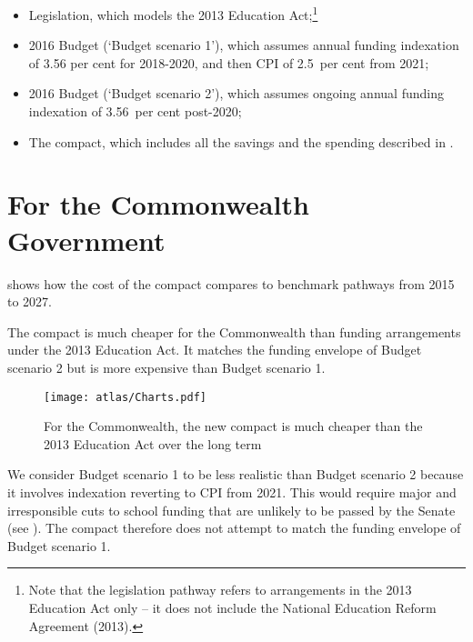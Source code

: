 \documentclass{grattan}
\begin{document}
\begin{itemize}
\item
  Legislation, which models the 2013 Education Act;\footnote{Note that the legislation pathway refers to arrangements in the 2013 Education Act only -- it does not include the National Education Reform Agreement (2013).}
\item
  2016 Budget (`Budget scenario 1'), which assumes annual funding indexation of 3.56 per cent for 2018-2020, and then CPI of 2.5~per cent from 2021;
\item
  2016 Budget (`Budget scenario 2'), which assumes ongoing annual funding indexation of 3.56~per cent post-2020;
\item
  The compact, which includes all the savings and the spending described in .
\end{itemize}

\section{For the Commonwealth Government}\label{sec:for-the-commonwealth}

 shows how the cost of the compact compares to benchmark pathways from 2015 to 2027.

The compact is much cheaper for the Commonwealth than funding arrangements under the 2013 Education Act.
It matches the funding envelope of Budget scenario 2 but is more expensive than Budget scenario 1.

\begin{figure}
\caption{For the Commonwealth, the new compact is much cheaper than the 2013 Education Act over the long term}\label{fig:For-Cth-compact-is-cheaper}


\texttt{[image: atlas/Charts.pdf]}

\end{figure}

We consider Budget scenario 1 to be less realistic than Budget scenario 2 because it involves indexation reverting to CPI from 2021.
This would require major and irresponsible cuts to school funding that are unlikely to be passed by the Senate (see ).
The compact therefore does not attempt to match the funding envelope of Budget scenario 1.
\end{document}
